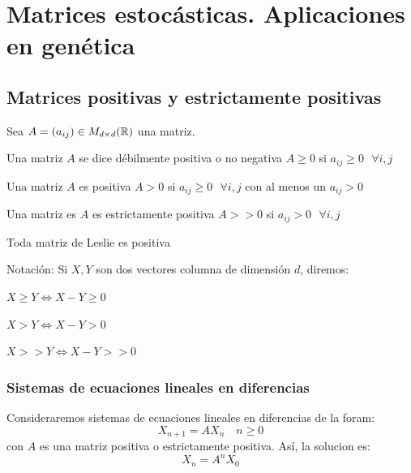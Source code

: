 \section{Matrices estocásticas. Aplicaciones en genética}

\subsection{Matrices positivas y estrictamente positivas}
Sea $A=(a_{ij})\in M_{d\times d}(\mathbb{R}) $ una matriz.
        \begin{ndef}
	Una matriz $A$ se dice débilmente positiva o no negativa  $A\geq 0$ si $a_{ij} \geq 0 \ \ \ \forall i,j$
\end{ndef}

\begin{ndef}
	Una matriz $A$ es positiva $A > 0$ si $a_{ij} \geq 0 \ \ \ \forall i,j$ con al menos un $a_{ij}> 0$
\end{ndef}

\begin{ndef}
	Una matriz es $A$ es estrictamente positiva $A >> 0$ si $a_{ij}> 0 \ \ \ \forall i ,j$
\end{ndef}

        \begin{nprop}
	Toda matriz de Leslie es positiva
\end{nprop}

\begin{nota}
	Notación: Si $X,Y$ son dos vectores columna de dimensión $d$, diremos:
	\begin{nlist}
	\item $X \geq Y \iff X-Y \geq 0$
	\item $X > Y \iff X-Y > 0$
	\item $X >> Y \iff X-Y >> 0$
\end{nlist}
\end{nota}
\begin{nprop}[Propiedades]

\end{nprop}

\subsubsection{Sistemas de ecuaciones lineales en diferencias}
Consideraremos sistemas de ecuaciones lineales en diferencias de la foram:
\[
X _{n+1} = A X_n \quad n \geq 0
\]
con $A$ es una matriz positiva o estrictamente positiva. Así, la solucion es:
\[
X_n = A^n X_0
\]

